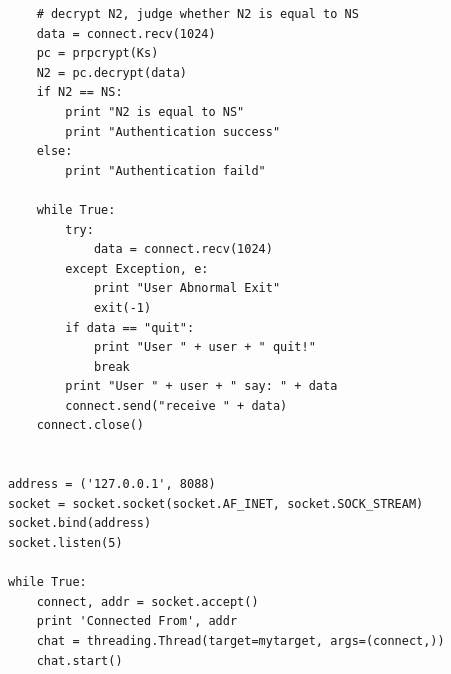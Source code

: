 \documentclass[11pt]{article}
\begin{document}
\begin{lstlisting}
    # decrypt N2, judge whether N2 is equal to NS
    data = connect.recv(1024)
    pc = prpcrypt(Ks)
    N2 = pc.decrypt(data)
    if N2 == NS:
        print "N2 is equal to NS"
        print "Authentication success"
    else:
        print "Authentication faild"

    while True:
        try:
            data = connect.recv(1024)
        except Exception, e:
            print "User Abnormal Exit"
            exit(-1)
        if data == "quit":
            print "User " + user + " quit!"
            break
        print "User " + user + " say: " + data
        connect.send("receive " + data)
    connect.close()


address = ('127.0.0.1', 8088)
socket = socket.socket(socket.AF_INET, socket.SOCK_STREAM)
socket.bind(address)
socket.listen(5)

while True:
    connect, addr = socket.accept()
    print 'Connected From', addr
    chat = threading.Thread(target=mytarget, args=(connect,))
    chat.start()
\end{lstlisting}
\end{document}
